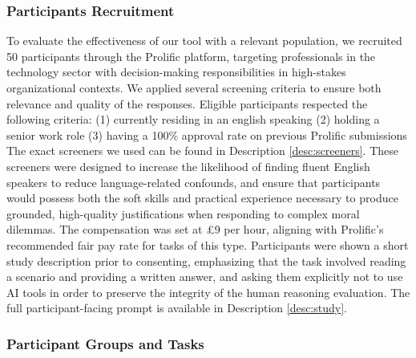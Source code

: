 \subsubsection{Participants Recruitment}

To evaluate the effectiveness of our tool with a relevant population, we recruited 50 participants through the Prolific platform, targeting professionals in the technology sector with decision-making responsibilities in high-stakes organizational contexts.
We applied several screening criteria to ensure both relevance and quality of the responses. Eligible participants respected the following criteria:
(1) currently residing in an english speaking
(2) holding a senior work role
(3) having a 100\% approval rate on previous Prolific submissions
The exact screeners we used can be found in Description \ref{desc:screeners}.
These screeners were designed to increase the likelihood of finding fluent English speakers to reduce language-related confounds, and ensure that participants would possess both the soft skills and practical experience necessary to produce grounded, high-quality justifications when responding to complex moral dilemmas.
The compensation was set at £9 per hour, aligning with Prolific's recommended fair pay rate for tasks of this type.
Participants were shown a short study description prior to consenting, emphasizing that the task involved reading a scenario and providing a written answer, and asking them explicitly not to use AI tools in order to preserve the integrity of the human reasoning evaluation. The full participant-facing prompt is available in Description \ref{desc:study}.

\subsubsection{Participant Groups and Tasks}

